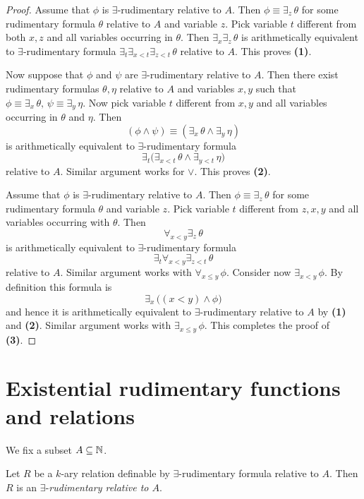 \documentclass[10pt]{amsart}
\begin{document}
\begin{proof}
	Assume that $\phi$ is $\exists$-rudimentary relative to $A$. Then $\phi \equiv \exists_z\,\theta$ for some rudimentary formula $\theta$ relative to $A$ and variable $z$. Pick variable $t$ different from both $x, z$ and all variables occurring in $\theta$. Then $\exists_x\exists_z\,\theta$ is arithmetically equivalent to $\exists$-rudimentary formula $\exists_t\exists_{x < t}\exists_{z < t}\,\theta$ relative to $A$. This proves \textbf{(1)}.

	Now suppose that $\phi$ and $\psi$ are $\exists$-rudimentary relative to $A$. Then there exist rudimentary formulas $\theta, \eta$ relative to $A$ and variables $x, y$ such that $\phi \equiv \exists_x\,\theta,\,\psi \equiv \exists_y\,\eta$.
	Now pick variable $t$ different from $x,y$ and all variables occurring in $\theta$ and $\eta$. Then
	$$\left(\phi \wedge \psi\right) \equiv \left(\exists_x\,\theta \wedge \exists_y\,\eta\right)$$
	is arithmetically equivalent to $\exists$-rudimentary formula
	$$\exists_t\big(\exists_{x < t}\,\theta \wedge \exists_{y < t}\,\eta\big)$$
	relative to $A$. Similar argument works for $\vee$. This proves \textbf{(2)}.

	Assume that $\phi$ is $\exists$-rudimentary relative to $A$. Then $\phi \equiv \exists_z\,\theta$ for some rudimentary formula $\theta$ and variable $z$. Pick variable $t$ different from $z, x, y$ and all variables occurring with $\theta$. Then
	$$\forall_{x < y}\exists_z\,\theta$$
	is arithmetically equivalent to $\exists$-rudimentary formula
	$$\exists_t\forall_{x < y}\exists_{z < t}\,\theta$$
  relative to $A$. Similar argument works with $\forall_{x \leq y}\,\phi$. Consider now $\exists_{x < y}\,\phi$. By definition this formula is
	$$\exists_x\,\big(\left(x < y\right)\wedge \phi\big)$$
  and hence it is arithmetically equivalent to $\exists$-rudimentary relative to $A$ by \textbf{(1)} and \textbf{(2)}. Similar argument works with $\exists_{x \leq y}\,\phi$. This completes the proof of \textbf{(3)}.
\end{proof}

\section{Existential rudimentary functions and relations}
\noindent
We fix a subset $A \subseteq {\mathbb N}$.

\begin{definition}
	Let $R$ be a $k$-ary relation definable by $\exists$-rudimentary formula relative to $A$. Then $R$ is an $\exists$-\textit{rudimentary relative to $A$}.
\end{definition}
\end{document}

